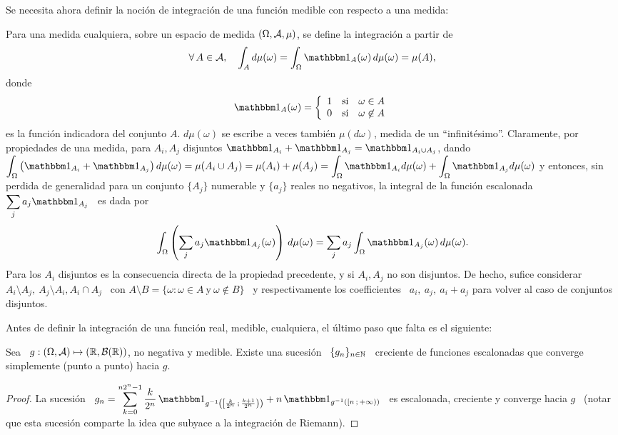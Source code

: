 Se necesita ahora definir la  noci\'on de integraci\'on de una funci\'on medible
con respecto a una medida:
%
\begin{definicion}
\label{Def:MP:MedidaIntegracion}
%
  Para una medida  cualquiera, sobre un espacio de  medida $(\Omega,\mathcal{A},\mu)$, se
  define la integraci\'on a partir de
  \[
  \forall \, A \in \A,  \quad \int_A d\mu(\omega) = \int_\Omega \un_A(\omega) \,
  d\mu(\omega) = \mu(A),
  \]
  donde
  \[
  \un_A(\omega) = \left\{
  \begin{array}{ccc}
  1 & \mbox{si} & \omega \in A\\
  0 & \mbox{si} & \omega \not\in A
  \end{array} \right.
  \]
  es  la funci\'on  indicadora del  conjunto $A$.   $d\mu(\omega)$ se  escribe a
  veces tambi\'en $\mu(d\omega)$,  medida de un ``infinit\'esimo''.  Claramente,
  por  propiedades  de una  medida,  para $  A_i,  A_j$  disjuntos $\un_{A_i}  +
  \un_{A_j}  =  \un_{A_i \cup  A_j}$,  dando  $\displaystyle \int_\Omega  \left(
    \un_{A_i} + \un_{A_j} \right) d\mu(\omega)  = \mu(A_i \cup A_j) = \mu(A_i) +
  \mu(A_j)  =   \int_\Omega  \un_{A_i}  d\mu(\omega)   +  \int_\Omega  \un_{A_j}
  d\mu(\omega)$ y entonces, sin perdida  de generalidad para un conjunto $\{ A_j
  \}$ numerable
  y $\{  a_j \}$ reales no negativos,  la integral de la  funci\'on escalonada \
  $\displaystyle \sum_j a_j \un_{A_j}$ \ es dada por
  \[
  \int_\Omega \left( \sum_j a_j \un_{A_j}(\omega) \right) \, d\mu(\omega) =
  \sum_j a_j \int_\Omega \un_{A_j}(\omega) \, d\mu(\omega).
  \]
  Para  los  $A_i$  disjuntos  es   la  consecuencia  directa  de  la  propiedad
  precedente, y  si $A_i,  A_j$ no son  disjuntos.  De hecho,  sufice considerar
  $A_i\setminus A_j, \:  A_j\setminus A_i, A_i \cap A_j$ \ con  $A \setminus B =
  \{ \omega: \omega \in A \: \mbox{y} \: \omega \not\in B\}$ \ y respectivamente
  los  coefficientes \  $a_i, \:  a_j, \:  a_i  + a_j$  para volver  al caso  de
  conjuntos disjuntos.
\end{definicion}


Antes de definir la integraci\'on de una funci\'on real, medible, cualquiera, el
\'ultimo paso que falta es el siguiente:
%
\begin{teorema}
\label{Teo:MP:MedibleLimite}
%
  Sea   \   $g:   (\Omega,\mathcal{A})   \mapsto  (\mathbb{R},\mathcal{B}(\mathbb{R}))$,   no   negativa   y
  medible. Existe  una sucesi\'on  \ $\{  g_n \}_{n \in  \mathbb{N}}$ \  creciente de
  funciones escalonadas que converge simplemente (punto a punto) hacia $g$.
\end{teorema}
%
\begin{proof}
  La  sucesi\'on \ $\displaystyle  g_n =  \sum_{k=0}^{n 2^n-1}  \frac{k}{2^n} \,
  \un_{g^{-1}\left(  \left[  \frac{k}{2^n}   \,  ;  \,  \frac{k+1}{2^n}  \right)
    \right)} + n \, \un_{g^{-1}\left( \left[ n \, ; \, +\infty \right) \right)}$
  \ es escalonada,  creciente y converge hacia $g$ \  (notar que esta sucesi\'on
  comparte la idea que subyace a la integraci\'on de Riemann).
\end{proof}

